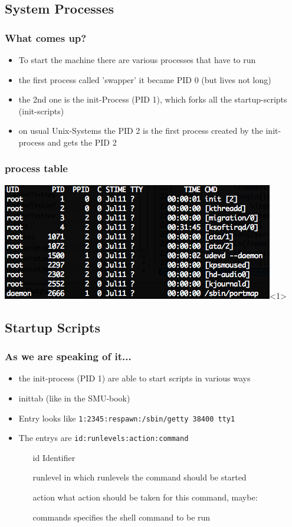 \documentclass[draft,handout]{beamer}
\newcommand{\code}[1]{\colorbox{lGray}{\texttt{#1}}}
\begin{document}
    \subsection{System Processes}
	    \begin{frame}
			\frametitle{What comes up?}
			\begin{itemize}
                \item<1-> To start the machine there are various processes that have to run
                \item<1-> the first process called 'swapper' it became PID 0 (but lives not long)
                \item<2-> the 2nd one is the init-Process (PID 1), which forks all the startup-scripts (init-scripts)
                \item<3-> on usual Unix-Systems the PID 2 is the first process created by the init-process and gets the PID 2
            \end{itemize}
		\end{frame}
	    \begin{frame}
			\frametitle{process table}
			\includegraphics[height=0.4\columnwidth]{pics/ps.png}<1>%
		\end{frame}
    \subsection{Startup Scripts}
	    \begin{frame}
			\frametitle{As we are speaking of it...}
			\begin{itemize}
                \item<1-> the init-process (PID 1) are able to start scripts in various ways
                \item<1-> inittab (like in the SMU-book)
                \item<1-> Entry looks like \code{1:2345:respawn:/sbin/getty 38400 tty1}
                \item<2-> The entrys are \code{id:runlevels:action:command}
                \begin{itemize}
                    \item[id] Identifier 
                    \item[runlevel] in which runlevels the command should be started 
                    \item[action] what action should be taken for this command, maybe:
                    \item[commands] specifies the shell command to be run
                \end{itemize}
            \end{itemize}
		\end{frame}
\end{document}
